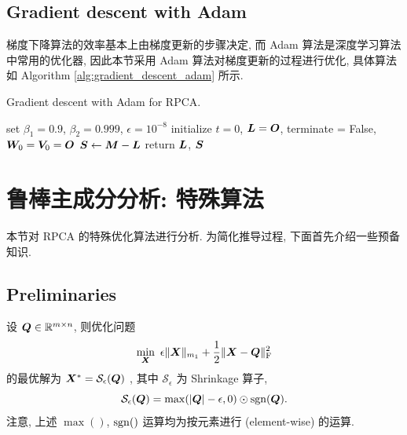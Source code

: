 \documentclass[12pt]{article}
\begin{document}
\subsection{Gradient descent with Adam}

梯度下降算法的效率基本上由梯度更新的步骤决定, 而 Adam \cite{kingma2014adam} 算法是深度学习算法中常用的优化器, 因此本节采用 Adam 算法对梯度更新的过程进行优化, 具体算法如 Algorithm \ref{alg:gradient_descent_adam} 所示.
\begin{algorithm}[!htbp]
  \label{alg:gradient_descent_adam}
  \caption{Gradient descent with Adam for RPCA.}
  set $\beta_1=0.9$, $\beta_2=0.999$, $\epsilon=10^{-8}$\;
  initialize $t=0$, $\bm{L}=\bm{O}$, terminate = False, $\bm{W}_0=\bm{V}_0=\bm{O}$\;
  $\bm{S} \leftarrow \bm{M}-\bm{L}$\;
  return $\bm{L}$, $\bm{S}$\;
\end{algorithm}

\section{鲁棒主成分分析: 特殊算法}

本节对 RPCA 的特殊优化算法进行分析. 为简化推导过程, 下面首先介绍一些预备知识.

\subsection{Preliminaries}

设 $\bm{Q}\in\mathbb{R}^{m\times n}$, 则优化问题
\begin{equation}
  \min_{\bm{X}}~\epsilon\|\bm{X}\|_{m_1}+\frac{1}{2}\|\bm{X}-\bm{Q}\|_{\text{F}}^2
\end{equation}
的最优解为 $\bm{X}^*=\mathcal{S}_\epsilon(\bm{Q})$ \cite{candes2011robust}, 其中 $\mathcal{S}_\epsilon$ 为 Shrinkage 算子,
\begin{equation}
  \mathcal{S}_\epsilon(\bm{Q})=\max(|\bm{Q}|-\epsilon, 0)\odot\operatorname{sgn}(\bm{Q}).
\end{equation}
注意, 上述 $\max()$, $\operatorname{sgn}()$ 运算均为按元素进行 (element-wise) 的运算.
\end{document}
